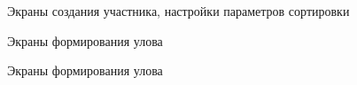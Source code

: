 \begin{figure}[ht!]
	\caption{Экраны создания участника, настройки параметров сортировки}
	\label{fig:gui5}
\end{figure}

\begin{figure}[ht!]
	\caption{Экраны формирования улова}
	\label{fig:gui6}
\end{figure}

\begin{figure}[ht!]
	\caption{Экраны формирования улова}
	\label{fig:gui7}
\end{figure}
